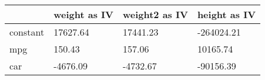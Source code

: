 \begin{tabular}{llll}
\toprule
{} & weight as IV & weight2 as IV & height as IV \\
\midrule
constant &     17627.64 &      17441.23 &   -264024.21 \\
mpg      &       150.43 &        157.06 &     10165.74 \\
car      &     -4676.09 &      -4732.67 &    -90156.39 \\
\bottomrule
\end{tabular}
